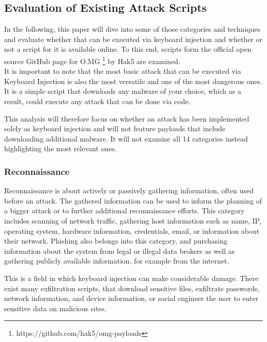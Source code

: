 \subsection{Evaluation of Existing Attack Scripts}

In the following, this paper will dive into some of those categories and techniques and evaluate whether that can be executed via keyboard injection and whether or not a script for it is available online. To this end, scripts form the official open source GitHub page for O.MG \footnote{https://github.com/hak5/omg-payloads} by Hak5 are examined. \\
It is important to note that the most basic attack that can be executed via Keyboard Injection is also the most versatile and one of the most dangerous ones. It is a simple script that downloads any malware of your choice, which as a result, could execute any attack that can be done via code.  

This analysis will therefore focus on whether an attack has been implemented solely as keyboard injection and will not feature payloads that include downloading additional malware. It will not examine all 14 categories instead highlighting the most relevant ones. %


\subsubsection{Reconnaissance} %

Reconnaissance is about actively or passively gathering information, often used before an attack. The gathered information can be used to inform the planning of a bigger attack or to further additional reconnaissance efforts. This category includes scanning of network traffic, gathering host information such as name, IP, operating system, hardware information, credentials, email, or information about their network. Phishing also belongs into this category, and purchasing information about the system from legal or illegal data brokers as well as gathering publicly available information, for example from the internet. 

This is a field in which keyboard injection can make considerable damage. There exist many exfiltration scripts, that download sensitive files, exfiltrate passwords, network information, and device information, or social engineer the user to enter sensitive data on malicious sites. 

